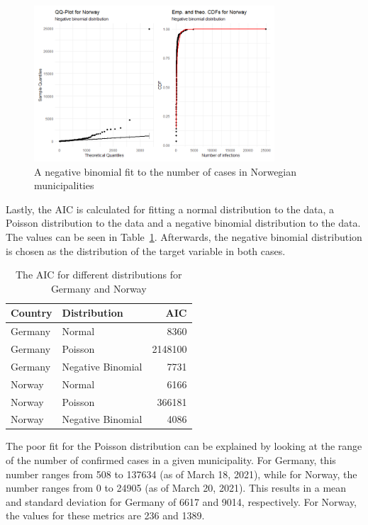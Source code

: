 \begin{figure}[H]
    \centering
    \includegraphics[width = 0.8\textwidth]{fit_nbinom_norway.png}
    \caption{A negative binomial fit to the number of cases in Norwegian municipalities}
    \label{fitNegbinomNorway}
\end{figure}
Lastly, the AIC is calculated for fitting a normal distribution to the data, a Poisson distribution to the data and a negative binomial distribution to the data. The values can be seen in Table~\ref{aic}. Afterwards, the negative binomial distribution is chosen as the distribution of the target variable in both cases. \\
\begin{table}[H] 
\caption{The AIC for different distributions for Germany and Norway \label{aic}}
\begin{tabular}{l l r}
\toprule
\textbf{Country}	& \textbf{Distribution}	& \textbf{AIC} \\
\midrule
Germany & Normal & 8360 \\
Germany & Poisson & 2148100 \\
Germany & Negative Binomial & 7731 \\
Norway & Normal & 6166 \\
Norway & Poisson & 366181 \\
Norway & Negative Binomial & 4086 \\
\bottomrule
\end{tabular}
\end{table} 
The poor fit for the Poisson distribution can be explained by looking at the range of the number of confirmed cases in a given municipality. For Germany, this number ranges from 508 to 137634 (as of March 18, 2021), while for Norway, the number ranges from 0 to 24905 (as of March 20, 2021). This results in a mean and standard deviation for Germany of 6617 and 9014, respectively. For Norway, the values for these metrics are 236 and 1389.
